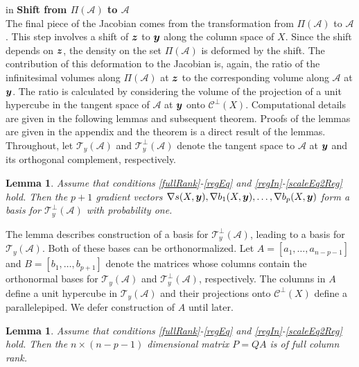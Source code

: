 \documentclass[ba]{imsart}
\newcommand{\by}{\mbox{\boldmath $y$}}
\newcommand{\bz}{\mbox{\boldmath $z$}}
\newcommand{\mc}{\mathcal}
\newtheorem{lemma}[theorem]{\bf Lemma}
\begin{document}
 in
\noindent
{\bf Shift from $\Pi(\mathcal{A})$ to $\mathcal{A}$} \\
The final piece of the Jacobian comes from the transformation from
$\Pi(\mathcal{A})$ to $\mathcal{A}$.  %
This step involves a shift of
$\bz$ to $\by$ along the column space of $X$. Since the shift depends on 
$\bz$, the density on the set 
$\Pi(\mathcal{A})$ is deformed by the shift. The
contribution of this deformation to the Jacobian is, again,
the ratio of the infinitesimal volumes along $\Pi(\mathcal{A})$ at $\bz$ to the
corresponding volume along $\mathcal{A}$ at $\by$. 
The ratio is calculated by considering the volume of the
projection of a unit hypercube in the tangent space of $\mathcal{A}$
at $\by$ onto $\mc{C}^\perp(X)$.
Computational details are
given in the following lemmas and subsequent theorem. Proofs of the lemmas are given in the appendix and the theorem is a direct result of the lemmas. Throughout, let
$\mc T_{y}(\mc A)$ and $\mc T_{y}^{\perp}(\mc A)$ denote the tangent
space to $\mc A$ at $\by$ and its orthogonal complement, respectively. %
\begin{lemma}
\label{lem:basis}
Assume that conditions \ref{fullRank}-\ref{regEq} and \ref{regIn}-\ref{scaleEq2Reg} hold.  Then the $p+1$ gradient vectors 
$\nabla s(X,\by), \nabla b_1(X,\by),\dots, \nabla b_p(X,\by)$ form a
basis for $\mc T_{y}^\perp(\mc A)$ with probability one.
\end{lemma}

The lemma describes construction of a basis for $\mc T_{y}^\perp(\mc A)$, leading to a 
basis for $\mc T_{y}(\mc A)$.  Both of these bases can be orthonormalized.  
Let $A=[a_{1},\dots,a_{n-p-1}]$  and $B=[b_1,\dots,b_{p+1}]$ denote the 
matrices whose columns contain the orthonormal bases for  $\mc T_{y}(\mc A)$ and  $\mc T^{\perp}_{y}(\mc A)$, respectively.  
The columns in $A$ define a unit hypercube in $\mc T_{y}(\mc
  A)$ and their projections onto $\mc{C}^\perp(X)$ define a parallelepiped.
We defer construction of $A$ until later. 

\begin{lemma}
\label{lem:fullrank}
Assume that conditions \ref{fullRank}-\ref{regEq} and \ref{regIn}-\ref{scaleEq2Reg} hold.  
Then the $n\times (n-p-1)$ dimensional matrix $P=QA$ is of full column rank.
\end{lemma}
\end{document}
